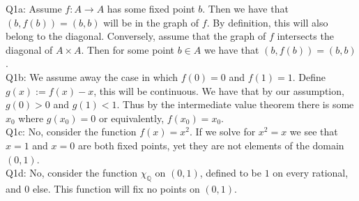 \documentclass[letterpaper]{article}
\DeclareMathOperator{\Q}{\mathbb{Q}}
\begin{document}
\noindent Q1a:
Assume $f:A\rightarrow A$ has some fixed point $b$. Then we have that $(b,f(b)) = (b,b)$ will be in the graph of $f$. By definition, this will also belong to the diagonal. 
Conversely, assume that the graph of $f$ intersects the diagonal of $A \times A$. Then for some point $b\in A$ we have that $(b,f(b))= (b,b)$. 
\newline \\    Q1b:
We assume away the case in which $f(0)=0$ and $f(1)=1$. Define $g(x):= f(x)-x$, this will be continuous. We have that by our assumption, $g(0)>0$ and $g(1)<1$. Thus by the intermediate value theorem there is some $x_0$ where $g(x_0)=0$ or equivalently, $f(x_0)=x_0$. 
\newline \\  Q1c:  No, consider the function $f(x)=x^2$. If we solve for $x^2=x$ we see that $x=1$ and $x=0$ are both fixed points, yet they are not elements of the domain $(0,1)$.
\newline \\ Q1d: No, consider the function $\chi_{\Q}$ on $(0,1)$, defined to be $1$ on every rational, and 0 else. This function will fix no points on $(0,1)$. 
\end{document}

